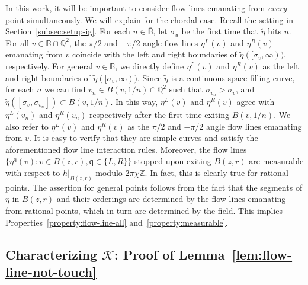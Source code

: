 \documentclass[a4paper]{article}
\numberwithin{equation}{section}
\numberwithin{equation}{section}
\renewcommand{\1}{\mathbf{1}}
\begin{document}
In this work, it will be important to consider flow lines emanating from \emph{every} point simultaneously. We will explain for the chordal case. Recall the setting in Section~\ref{subsec:setup-ig}. For each $u \in \overline{\mathbb B}$, let $\sigma_u$ be the first time that $\widetilde \eta$ hits $u$. For all $v \in \overline{\mathbb B} \cap \mathbb Q^2$, the $\pi/2$ and $-\pi/2$ angle flow lines $\eta^L(v)$ and $\eta^R(v)$ emanating from $v$ coincide with the left and right boundaries of $\widetilde \eta([\sigma_v,\infty))$, respectively. For general $v \in \overline{\mathbb B}$, we directly define $\eta^L(v)$ and $\eta^R(v)$ as the left and right boundaries of $\widetilde \eta([\sigma_v,\infty))$. Since $\widetilde \eta$ is a continuous space-filling curve, for each $n$ we can find $v_n \in B(v,1/n) \cap \mathbb Q^2$ such that $\sigma_{v_n}>\sigma_v$, and $\widetilde \eta([\sigma_v,\sigma_{v_n}]) \subset B(v,1/n)$. In this way, $\eta^L(v)$ and $\eta^R(v)$ agree with $\eta^L(v_n)$ and $\eta^R(v_n)$ respectively after the first time exiting $B(v,1/n)$. We also refer to $\eta^L(v)$ and $\eta^R(v)$ as the $\pi/2$ and $-\pi/2$ angle flow lines emanating from $v$. It is easy to verify that they are simple curves and satisfy the aforementioned flow line interaction rules. Moreover, the flow lines $\{\eta^{\mathsf q}(v):v \in B(z,r), \mathsf q \in \{L,R\}\}$ stopped upon exiting $B(z,r)$ are measurable with respect to $h|_{B(z,r)}$ modulo $2\pi\chi \mathbb Z$. In fact, this is clearly true for rational points. The assertion for general points follows from the fact that the segments of $\widetilde \eta$ in $B(z,r)$ and their orderings are determined by the flow lines emanating from rational points, which in turn are determined by the field. This implies Properties~\eqref{property:flow-line-all} and~\eqref{property:measurable}.

\subsection{Characterizing $\mathcal K$: Proof of Lemma~\ref{lem:flow-line-not-touch}}\label{subsec:flow-line-not-touch}
\end{document}
